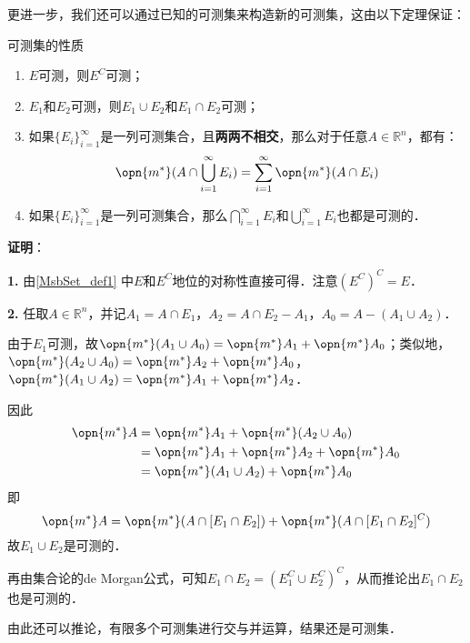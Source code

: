 更进一步，我们还可以通过已知的可测集来构造新的可测集，这由以下定理保证：

\begin{theorem}{可测集的性质}\label{MsbSet_the1}

\begin{enumerate}
\item $E$可测，则$E^C$可测；
\item $E_1$和$E_2$可测，则$E_1\cup E_2$和$E_1\cap E_2$可测；
\item 如果$\{E_i\}_{i=1}^{\infty}$是一列可测集合，且\textbf{两两不相交}，那么对于任意$A\in\mathbb{R}^n$，都有：
\begin{equation}\label{MsbSet_eq4}
\opn{m^*}(A\cap \bigcup_{i=1}^{\infty}E_i)=\sum_{i=1}^{\infty}\opn{m^*}(A\cap E_i)
\end{equation}
\item 如果$\{E_i\}_{i=1}^{\infty}$是一列可测集合，那么$\bigcap_{i=1}^{\infty}E_i$和$\bigcup_{i=1}^{\infty}E_i$也都是可测的．
\end{enumerate}

\end{theorem}

\textbf{证明}：


\textbf{1.} 由\autoref{MsbSet_def1} 中$E$和$E^C$地位的对称性直接可得．注意$(E^C)^C=E$．

\textbf{2.} 任取$A\in\mathbb{R}^n$，并记$A_1=A\cap E_1$，$A_2=A\cap E_2-A_1$，$A_0=A-(A_1\cup A_2)$．


由于$E_1$可测，故$\opn{m^*}(A_1\cup A_0)=\opn{m^*}A_1+\opn{m^*}A_0$；类似地，$\opn{m^*}(A_2\cup A_0)=\opn{m^*}A_2+\opn{m^*}A_0$，$\opn{m^*}(A_1\cup A_2)=\opn{m^*}A_1+\opn{m^*}A_2$．

因此
\begin{equation}
\begin{aligned}
\opn{m^*}A&=\opn{m^*}A_1+\opn{m^*}(A_2\cup A_0)\\
&=\opn{m^*}A_1+\opn{m^*}A_2+\opn{m^*}A_0\\
&=\opn{m^*}(A_1\cup A_2)+\opn{m^*}A_0
\end{aligned}
\end{equation}
即
\begin{equation}
\opn{m^*}A=\opn{m^*}(A\cap [E_1\cap E_2])+\opn{m^*}(A\cap [E_1\cap E_2]^C)
\end{equation}
故$E_1\cup E_2$是可测的．

再由集合论的de Morgan公式，可知$E_1\cap E_2=(E_1^C\cup E_2^C)^C$，从而推论出$E_1\cap E_2$也是可测的．

由此还可以推论，有限多个可测集进行交与并运算，结果还是可测集．

